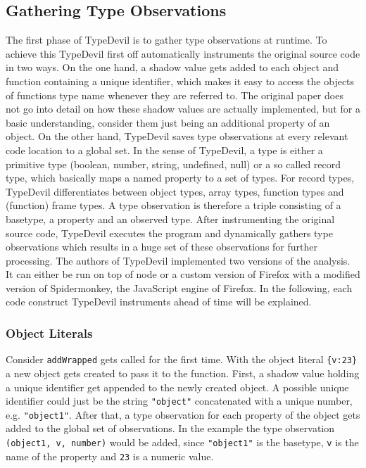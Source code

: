 \documentclass[runningheads,a4paper]{llncs}
\begin{document}
\subsection{Gathering Type Observations}

The first phase of TypeDevil is to gather type observations at runtime.
To achieve this TypeDevil first off automatically instruments the original source code in two ways.
On the one hand, a shadow value gets added to each object and function containing a unique identifier, which makes it easy to access the objects of functions type name whenever they are referred to. 
The original paper does not go into detail on how these shadow values are actually implemented, but for a basic understanding, consider them just being an additional property of an object.
On the other hand, TypeDevil saves type observations at every relevant code location to a global set.
In the sense of TypeDevil, a type is either a primitive type (boolean, number, string, undefined, null) or a so called record type, which basically maps a named property to a set of types.
For record types, TypeDevil differentiates between object types, array types, function types and (function) frame types.
A type observation is therefore a triple consisting of a basetype, a property and an observed type.
After instrumenting the original source code, TypeDevil executes the program and dynamically gathers type observations which results in a huge set of these observations for further processing.
The authors of TypeDevil implemented two versions of the analysis. 
It can either be run on top of node or a custom version of Firefox with a modified version of Spidermonkey, the JavaScript engine of Firefox.
In the following, each code construct TypeDevil instruments ahead of time will be explained.

\subsubsection{Object Literals}
Consider \lstinline[columns=fixed]{addWrapped} gets called for the first time.
With the object literal \lstinline[columns=fixed]!{v:23}! a new object gets created to pass it to the function.
First, a shadow value holding a unique identifier get appended to the newly created object. A possible unique identifier could just be the string \lstinline[columns=fixed]{"object"} concatenated with a unique number, e.g. \lstinline[columns=fixed]{"object1"}.
After that, a type observation for each property of the object gets added to the global set of observations.
In the example the type observation \lstinline[columns=fixed]{(object1, v, number)} would be added, since \lstinline[columns=fixed]{"object1"} is the basetype, \lstinline[columns=fixed]{v} is the name of the property and \lstinline[columns=fixed]{23} is a numeric value.
\end{document}
